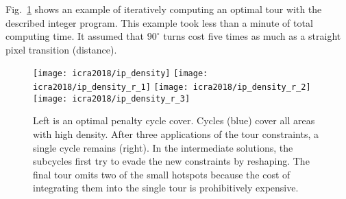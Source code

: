 
Fig.~\ref{fig:ipexample} shows an example of iteratively computing an optimal tour with the described integer program.
This example took less than a minute of total computing time.
It assumed that $90^\circ$ turns cost five times as much as a straight pixel transition (distance).

\begin{figure}
	\texttt{[image: icra2018/ip\_density]}
	\texttt{[image: icra2018/ip\_density\_r\_1]}
	\texttt{[image: icra2018/ip\_density\_r\_2]}
	\texttt{[image: icra2018/ip\_density\_r\_3]}
	\caption{Left is an optimal penalty cycle cover. Cycles (blue) cover all areas with high density. After three applications of the tour constraints, a single cycle remains (right). In the intermediate solutions, the subcycles first try to evade the new constraints by reshaping. The final tour omits two of the small hotspots because the cost of integrating them into the single 
tour is prohibitively expensive.}
\vspace{-1em}
	\label{fig:ipexample}
\end{figure}
